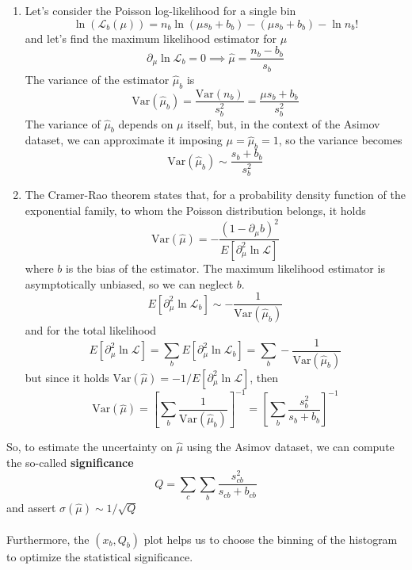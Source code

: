 \begin{enumerate}
    \item Let's consider the Poisson log-likelihood for a single bin
\begin{equation}
    \ln\left(\mathcal{L}_b(\mu)\right)=n_b \ln(\mu s_b + b_b) - (\mu s_b + b_b)-\ln n_b! 
\end{equation}
and let's find the maximum likelihood estimator for $\mu$
\begin{equation}
    \partial_\mu \ln{\mathcal{L}_b}=0 \implies \hat{\mu}=\frac{n_b-b_b}{s_b}
\end{equation}
The variance of the estimator $\hat{\mu}_b$ is
\begin{equation}
    {\mathrm{Var}}(\hat{\mu}_b)=\frac{{\mathrm{Var}}(n_b)}{s_b^2}=\frac{\mu s_b + b_b }{s_b^2}
\end{equation}
The variance of $\hat{\mu}_b$ depends on $\mu$ itself, but, in the context of the Asimov dataset, we can approximate it imposing $\mu=\hat{\mu}_b=1$, so the variance becomes
\begin{equation}
    {\mathrm{Var}}(\hat{\mu}_b)\sim \frac{s_b+b_b}{s_b^2}
\end{equation}
 \item The Cramer-Rao theorem \cite{James2006StatisticalEdition} states that, for a probability density function of the exponential family, to whom the Poisson distribution belongs, it holds
\begin{equation}
    \mathrm{Var}(\hat{\mu})=-\frac{(1-\partial_\mu b)^2}{E[\partial_\mu^2 \ln \mathcal{L}]}
\end{equation}
where $b$ is the bias of the estimator.
The maximum likelihood estimator is asymptotically unbiased, so we can neglect $b$.
\begin{equation}
    E[\partial_\mu^2 \ln \mathcal{L}_b]\sim-\frac{1}{\mathrm{Var}(\hat{\mu}_b)}
\end{equation}
and for the total likelihood
\begin{equation}
    E[\partial_\mu^2 \ln \mathcal{L}]=
    \sum_b E[\partial_\mu^2 \ln \mathcal{L}_b]=\sum_b
    -\frac{1}{\mathrm{Var}(\hat{\mu}_b)}
\end{equation}
but since it holds $\mathrm{Var}(\hat{\mu}) =-1/E[\partial_\mu^2 \ln \mathcal{L}]$, then
\begin{equation}
    \mathrm{Var}(\hat{\mu})=\left[\sum_b \frac{1}{\mathrm{Var}(\hat{\mu}_b)}\right]^{-1}= \left[\sum_b \frac{s_b^2}{s_b+b_b} \right]^{-1}
\end{equation}
\end{enumerate}
So, to estimate the uncertainty on $\hat{\mu}$ using the Asimov dataset, we can compute the so-called \textbf{significance}
\begin{equation}
    Q=\sum_c \sum_b \frac{s_{cb}^2}{s_{cb}+b_{cb}}
\end{equation}
and assert $\sigma(\hat{\mu}) \sim 1/\sqrt{Q}$\\
\\
Furthermore, the $(x_b,Q_b)$ plot helps us to choose the binning of the histogram to optimize the statistical significance.
